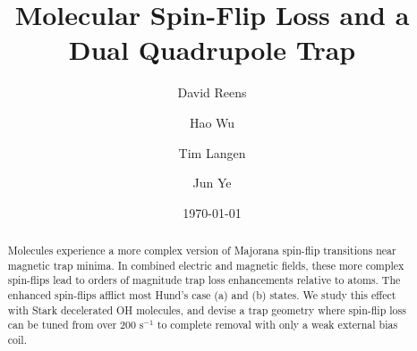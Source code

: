 \documentclass[%
 reprint,
groupedaddress,
 amsmath,amssymb,
 aps,
prl,
]{revtex4-1}
\begin{document}

\title{Molecular Spin-Flip Loss and a Dual Quadrupole Trap}%

\author{David Reens}
%
\author{Hao Wu}
\author{Tim Langen}%
\author{Jun Ye}
%

\date{\today}%


\begin{abstract}
Molecules experience a more complex version of Majorana spin-flip transitions near magnetic trap minima. In combined electric and magnetic fields, these more complex spin-flips lead to orders of magnitude trap loss enhancements relative to atoms. The enhanced spin-flips afflict most Hund's case (a) and (b) states. We study this effect with Stark decelerated OH molecules, and devise a trap geometry where spin-flip loss can be tuned from over $200 \text{ s}^{-1} $ to complete removal with only a weak external bias coil. 
\end{abstract}


\maketitle
\end{document}
